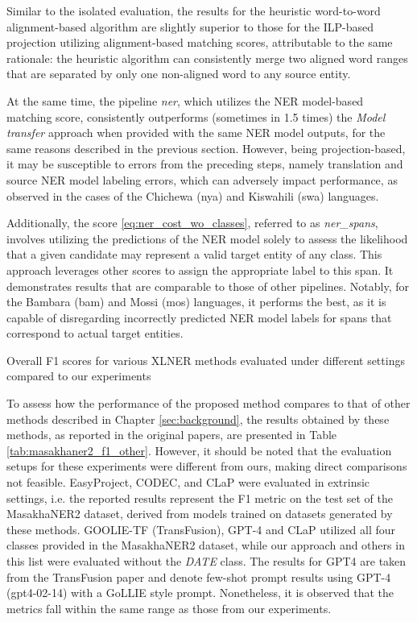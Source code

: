 Similar to the isolated evaluation, the results for the heuristic word-to-word
alignment-based algorithm are slightly superior to those for the ILP-based projection
utilizing alignment-based matching scores, attributable to the same rationale: the
heuristic algorithm can consistently merge two aligned word ranges that are separated
by only one non-aligned word to any source entity.

At the same time, the pipeline \textit{ner}, which utilizes the NER model-based matching
score, consistently outperforms (sometimes in 1.5 times) the \textit{Model transfer} approach when provided with the same
NER model outputs, for the same reasons described in the previous section. However,
being projection-based, it may be susceptible to errors from the preceding steps, namely
translation and source NER model labeling errors, which can adversely impact performance,
as observed in the cases of the Chichewa (nya) and Kiswahili (swa) languages.

Additionally, the score \eqref{eq:ner_cost_wo_classes}, referred to as \textit{ner\_spans},
involves utilizing the predictions of the NER model solely to assess the likelihood
that a given candidate may represent a valid target entity of any class. This approach
leverages other scores to assign the appropriate label to this span.
It demonstrates results that are comparable to those of other pipelines.
Notably, for the Bambara (bam) and Mossi (mos) languages, it performs the best, as
it is capable of disregarding incorrectly predicted NER model labels for spans that
correspond to actual target entities.

\begin{table}[ht]
  
  \caption{Overall F1 scores for various XLNER methods evaluated under different
  settings compared to our experiments}
  \label{tab:masakhaner2_f1_other}
\end{table}
To assess how the performance of the proposed method compares to that of other methods described
in Chapter \ref{sec:background}, the results obtained by these methods, as reported in the original
papers, are presented in Table \ref{tab:masakhaner2_f1_other}. However, it should be noted that the
evaluation setups for these experiments were different from ours, making direct comparisons not feasible.
EasyProject, CODEC, and CLaP were evaluated in extrinsic settings, i.e. the reported results represent the
F1 metric on the test set of the MasakhaNER2 dataset, derived from models trained on datasets generated
by these methods. GOOLIE-TF (TransFusion), GPT-4 and CLaP utilized all four classes provided in the MasakhaNER2 dataset,
while our approach and others in this list were evaluated without the \textit{DATE} class.
The results for GPT4 are taken from the TransFusion paper \cite{transfusion} and denote few-shot
prompt results using GPT-4 (gpt4-02-14) with a GoLLIE \cite{sainz2024gollieannotationguidelinesimprove} style prompt.
Nonetheless, it is observed that the metrics fall within the same range as those from our experiments.

